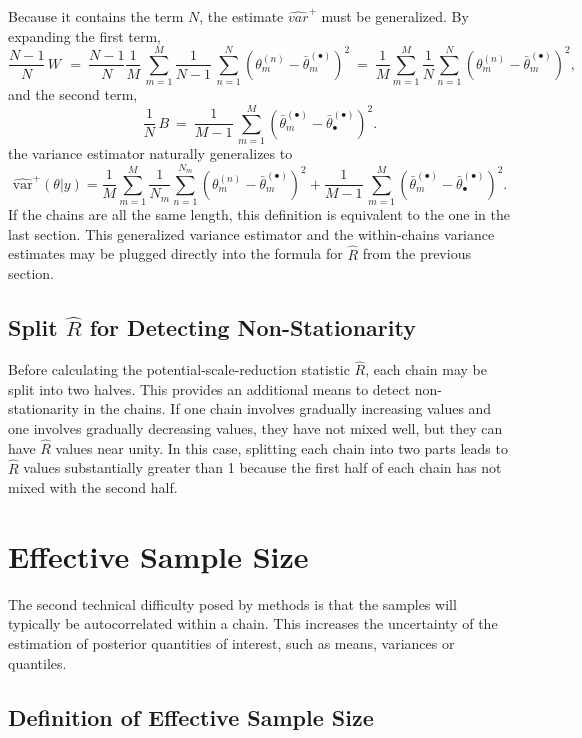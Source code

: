 Because it contains the term $N$, the estimate $\widehat{var}^{+}$
must be generalized.  By expanding the first term,
\[
\frac{N-1}{N}\, W \, 
\ = \ 
\frac{N-1}{N} \frac{1}{M} \, \sum_{m=1}^M
\frac{1}{N-1} \, \sum_{n=1}^N (\theta^{(n)}_m -
\bar{\theta}^{(\bullet)}_m)^2
\ = \
\frac{1}{M} 
\sum_{m=1}^M
\frac{1}{N}
\sum_{n=1}^N (\theta^{(n)}_m -
\bar{\theta}^{(\bullet)}_m)^2,
\]
and the second term,
\[
\frac{1}{N}\, B
\ = \
\frac{1}{M-1} \, \sum_{m=1}^M (\bar{\theta}^{(\bullet)}_{m} - \bar{\theta}^{(\bullet)}_{\bullet})^2.
\]
the variance estimator naturally generalizes to
\[
\widehat{\mbox{var}}^{+}\!(\theta|y)
= 
\frac{1}{M} 
\sum_{m=1}^M
\frac{1}{N_m}
\sum_{n=1}^{N_m} (\theta^{(n)}_m -
\bar{\theta}^{(\bullet)}_m)^2
+
\frac{1}{M-1} \, \sum_{m=1}^M (\bar{\theta}^{(\bullet)}_{m} -
\bar{\theta}^{(\bullet)}_{\bullet})^2.
\]
%
If the chains are all the same length, this definition is equivalent
to the one in the last section.  This generalized variance estimator
and the within-chains variance estimates may be plugged directly into
the formula for $\hat{R}$ from the previous section.


\subsection{Split $\hat{R}$ for Detecting Non-Stationarity}

Before calculating the potential-scale-reduction statistic $\hat{R}$,
each chain may be split into two halves.  This provides an additional
means to detect non-stationarity in the chains.  If one chain involves
gradually increasing values and one involves gradually decreasing
values, they have not mixed well, but they can have $\hat{R}$ values
near unity.  In this case, splitting each chain into two parts leads
to $\hat{R}$ values substantially greater than 1 because the first
half of each chain has not mixed with the second half.  

\section{Effective Sample Size}\label{effective-sample-size.section}

The second technical difficulty posed by \MCMC methods is that the
samples will typically be autocorrelated within a chain.  This
increases the uncertainty of the estimation of posterior quantities of
interest, such as means, variances or quantiles.

\subsection{Definition of Effective Sample Size}

